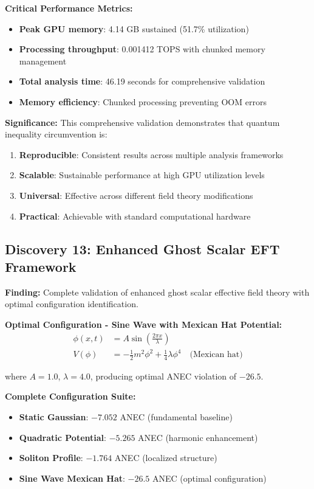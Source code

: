 \documentclass[11pt]{article}
\begin{document}
\textbf{Critical Performance Metrics:}
\begin{itemize}
    \item \textbf{Peak GPU memory}: 4.14 GB sustained (51.7\% utilization)
    \item \textbf{Processing throughput}: 0.001412 TOPS with chunked memory management
    \item \textbf{Total analysis time}: 46.19 seconds for comprehensive validation
    \item \textbf{Memory efficiency}: Chunked processing preventing OOM errors
\end{itemize}

\textbf{Significance:} This comprehensive validation demonstrates that quantum inequality circumvention is:
\begin{enumerate}
    \item \textbf{Reproducible}: Consistent results across multiple analysis frameworks
    \item \textbf{Scalable}: Sustainable performance at high GPU utilization levels
    \item \textbf{Universal}: Effective across different field theory modifications
    \item \textbf{Practical}: Achievable with standard computational hardware
\end{enumerate}

\subsection{Discovery 13: Enhanced Ghost Scalar EFT Framework}

\textbf{Finding:} Complete validation of enhanced ghost scalar effective field theory with optimal configuration identification.

\textbf{Optimal Configuration - Sine Wave with Mexican Hat Potential:}
\begin{align}
\phi(x,t) &= A \sin\left(\frac{2\pi x}{\lambda}\right) \\
V(\phi) &= -\frac{1}{2}m^2\phi^2 + \frac{1}{4}\lambda\phi^4 \quad \text{(Mexican hat)}
\end{align}

where $A = 1.0$, $\lambda = 4.0$, producing optimal ANEC violation of $-26.5$.

\textbf{Complete Configuration Suite:}
\begin{itemize}
    \item \textbf{Static Gaussian}: $-7.052$ ANEC (fundamental baseline)
    \item \textbf{Quadratic Potential}: $-5.265$ ANEC (harmonic enhancement)
    \item \textbf{Soliton Profile}: $-1.764$ ANEC (localized structure)
    \item \textbf{Sine Wave Mexican Hat}: $-26.5$ ANEC (optimal configuration)
\end{itemize}
\end{document}
